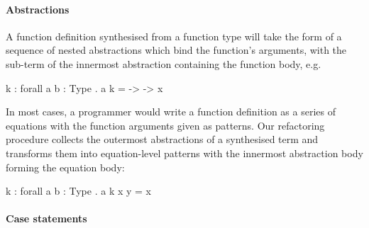 \paragraph{Abstractions}
 A function definition synthesised from a function type will take the form of a sequence of nested abstractions which bind the function's arguments, with the sub-term of the innermost abstraction containing the function body, e.g.
\begin{granule}
  k : forall {a b : Type} . a %
  k = \x -> \y -> x
\end{granule}
  In most cases, a programmer would write a function definition as a series of equations with the function arguments given as patterns. Our refactoring procedure collects the outermost abstractions of a synthesised term and transforms them into equation-level patterns with the innermost abstraction body forming the equation body:
\begin{granule}
  k : forall {a b : Type} . a %
  k x y = x
\end{granule}
\paragraph{Case statements}

